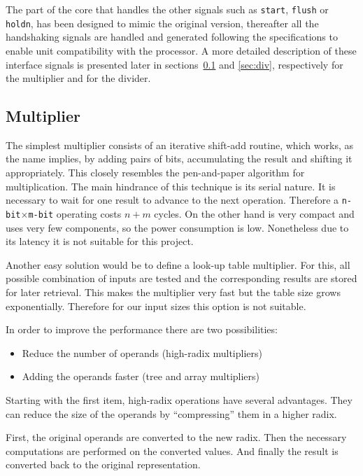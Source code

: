 The part of the core that handles the other signals such as \texttt{start}, \texttt{flush} or \texttt{holdn}, has been designed
to mimic the original version, thereafter all the handshaking signals are handled and generated following the
specifications to enable unit compatibility with the processor.
A more detailed description of these interface signals is presented later in sections~\ref{sec:mul} and \ref{sec:div}, respectively for the multiplier and for the divider.


\subsection{Multiplier}
\label{sec:mul}

The simplest multiplier consists of an iterative shift-add routine, which works, as the name implies, by adding pairs of bits, accumulating the result and shifting it appropriately. This closely resembles the pen-and-paper algorithm for multiplication. The main hindrance of this technique is its serial nature. It is necessary to wait for one result to advance to the next operation. Therefore a \texttt{n-bit$\times$m-bit} operating costs $n+m$ cycles. On the other hand is very compact and uses very few components, so the power consumption is low. Nonetheless due to its latency it is not suitable for this project.

Another easy solution would be to define a look-up table multiplier. For this, all possible combination of inputs are tested and the corresponding results are stored for later retrieval. This makes the multiplier very fast but the table size grows exponentially. Therefore for our input sizes this option is not suitable.

In order to improve the performance there are two possibilities:
\begin{itemize}
\item Reduce the number of operands (\ie high-radix multipliers)
\item Adding the operands faster (\ie tree and array multipliers)
\end{itemize}

Starting with the first item, high-radix operations have several advantages.
They can reduce the size of the operands by ``compressing'' them in a higher radix.

First, the original operands are converted to the new radix. Then the necessary computations are performed on the converted values. And finally the result is converted back to the original representation.

